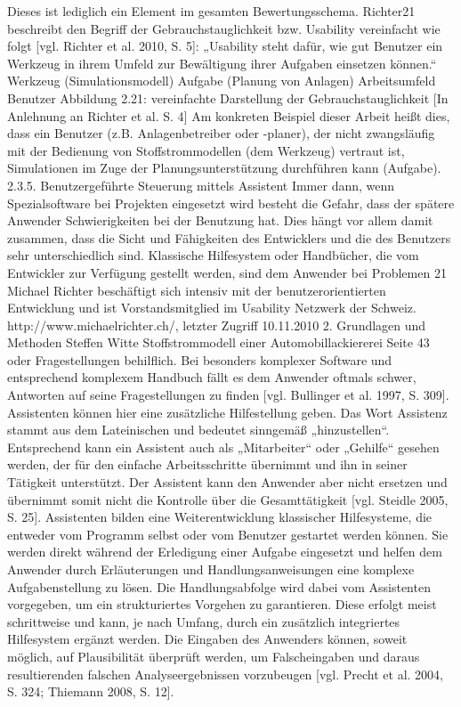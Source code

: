 \documentclass[a4paper, 12pt, twoside, BCOR=20mm, DIV=calc, abstracton, parskip=half*, toc=bibliography, toc=listof, headsepline, footsepline, headings=small, numbers=enddot]{scrreprt}
\begin{document}
Dieses ist lediglich ein Element im gesamten Bewertungsschema. Richter21 beschreibt
den Begriff der Gebrauchstauglichkeit bzw. Usability vereinfacht wie folgt
[vgl. Richter et al. 2010, S. 5]:
„Usability steht dafür, wie gut Benutzer ein Werkzeug in ihrem Umfeld zur Bewältigung
ihrer Aufgaben einsetzen können.“
Werkzeug
(Simulationsmodell)
Aufgabe
(Planung von Anlagen)
Arbeitsumfeld
Benutzer
Abbildung 2.21: vereinfachte Darstellung der Gebrauchstauglichkeit [In Anlehnung an Richter
et al. S. 4]
Am konkreten Beispiel dieser Arbeit heißt dies, dass ein Benutzer (z.B. Anlagenbetreiber
oder -planer), der nicht zwangsläufig mit der Bedienung von Stoffstrommodellen
(dem Werkzeug) vertraut ist, Simulationen im Zuge der Planungsunterstützung
durchführen kann (Aufgabe).
2.3.5. Benutzergeführte Steuerung mittels Assistent
Immer dann, wenn Spezialsoftware bei Projekten eingesetzt wird besteht die Gefahr,
dass der spätere Anwender Schwierigkeiten bei der Benutzung hat. Dies hängt vor
allem damit zusammen, dass die Sicht und Fähigkeiten des Entwicklers und die des
Benutzers sehr unterschiedlich sind. Klassische Hilfesystem oder Handbücher, die
vom Entwickler zur Verfügung gestellt werden, sind dem Anwender bei Problemen
21 Michael Richter beschäftigt sich intensiv mit der benutzerorientierten Entwicklung und ist Vorstandsmitglied
im Usability Netzwerk der Schweiz. http://www.michaelrichter.ch/, letzter Zugriff
10.11.2010
2. Grundlagen und Methoden
Steffen Witte Stoffstrommodell einer Automobillackiererei Seite 43
oder Fragestellungen behilflich. Bei besonders komplexer Software und entsprechend
komplexem Handbuch fällt es dem Anwender oftmals schwer, Antworten auf
seine Fragestellungen zu finden [vgl. Bullinger et al. 1997, S. 309]. Assistenten können
hier eine zusätzliche Hilfestellung geben.
Das Wort Assistenz stammt aus dem Lateinischen und bedeutet sinngemäß „hinzustellen“.
Entsprechend kann ein Assistent auch als „Mitarbeiter“ oder „Gehilfe“ gesehen
werden, der für den einfache Arbeitsschritte übernimmt und ihn in seiner Tätigkeit
unterstützt. Der Assistent kann den Anwender aber nicht ersetzen und übernimmt
somit nicht die Kontrolle über die Gesamttätigkeit [vgl. Steidle 2005, S. 25].
Assistenten bilden eine Weiterentwicklung klassischer Hilfesysteme, die entweder
vom Programm selbst oder vom Benutzer gestartet werden können. Sie werden direkt
während der Erledigung einer Aufgabe eingesetzt und helfen dem Anwender
durch Erläuterungen und Handlungsanweisungen eine komplexe Aufgabenstellung
zu lösen. Die Handlungsabfolge wird dabei vom Assistenten vorgegeben, um ein
strukturiertes Vorgehen zu garantieren. Diese erfolgt meist schrittweise und kann, je
nach Umfang, durch ein zusätzlich integriertes Hilfesystem ergänzt werden. Die Eingaben
des Anwenders können, soweit möglich, auf Plausibilität überprüft werden, um
Falscheingaben und daraus resultierenden falschen Analyseergebnissen vorzubeugen
[vgl. Precht et al. 2004, S. 324; Thiemann 2008, S. 12].	
		
\end{document}
